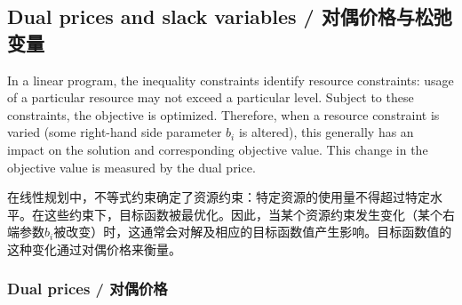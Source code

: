 \subsection{Dual prices and slack variables / 对偶价格与松弛变量}

\begin{original}
In a linear program, the inequality constraints identify resource constraints: usage of a particular resource may not exceed a particular level. Subject to these constraints, the objective is optimized. Therefore, when a resource constraint is varied (some right-hand side parameter $b_i$ is altered), this generally has an impact on the solution and corresponding objective value. This change in the objective value is measured by the dual price.
\end{original}
\begin{translation}
在线性规划中，不等式约束确定了资源约束：特定资源的使用量不得超过特定水平。在这些约束下，目标函数被最优化。因此，当某个资源约束发生变化（某个右端参数$b_i$被改变）时，这通常会对解及相应的目标函数值产生影响。目标函数值的这种变化通过对偶价格来衡量。
\end{translation}

\subsubsection{Dual prices / 对偶价格}

